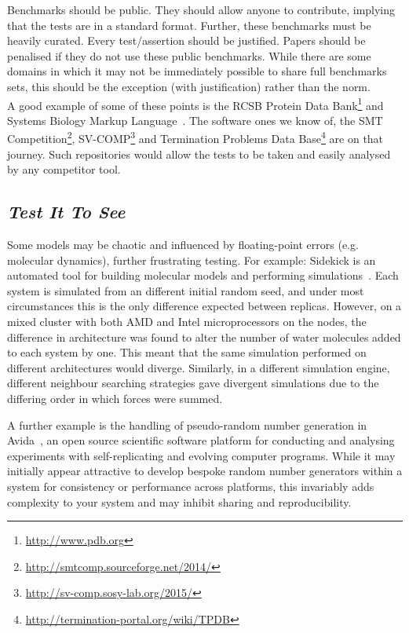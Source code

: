 \documentclass[a4paper,11pt]{article}
\begin{document}
 Benchmarks should
be public. They should allow anyone to contribute, implying that the
tests are in a standard format. Further, these benchmarks must be
heavily curated. Every test/assertion should be justified. Papers
should be penalised if they do not use these public benchmarks. While
there are some domains in which it may not be immediately possible to
share full benchmarks sets, this should be the exception (with
justification) rather than the norm.\\

A good example of some of these points is the RCSB Protein Data
Bank\footnote{\url{http://www.pdb.org}} and Systems Biology Markup
Language~\cite{Chaouiya2013}. The software ones we know of,
the SMT
Competition\footnote{\url{http://smtcomp.sourceforge.net/2014/}},
SV-COMP\footnote{\url{http://sv-comp.sosy-lab.org/2015/}} and
Termination Problems Data
Base\footnote{\url{http://termination-portal.org/wiki/TPDB}} are on
that journey. Such repositories would allow the tests to be taken and
easily analysed by any competitor tool.

\subsection{{\emph{Test It To See}}}

Some models may be chaotic and influenced by floating-point errors
(e.g. molecular dynamics), further frustrating testing. For example:
Sidekick is an automated tool for building molecular models and
performing simulations~\cite{Hall2014Sidekick}. Each system is
simulated from an different initial random seed, and under most
circumstances this is the only difference expected between
replicas. However, on a mixed cluster with both AMD and Intel
microprocessors on the nodes, the difference in architecture was found
to alter the number of water molecules added to each system by
one. This meant that the same simulation performed on different
architectures would diverge. Similarly, in a different simulation
engine, different neighbour searching strategies gave divergent
simulations due to the differing order in which forces were summed.

A further example is the handling of pseudo-random number generation
in Avida~\cite{ofria+wilke:2004}, an open source scientific software
platform for conducting and analysing experiments with
self-replicating and evolving computer programs. While it may
initially appear attractive to develop bespoke random number
generators within a system for consistency or performance across
platforms, this invariably adds complexity to your system and may
inhibit sharing and reproducibility.\\
\end{document}
